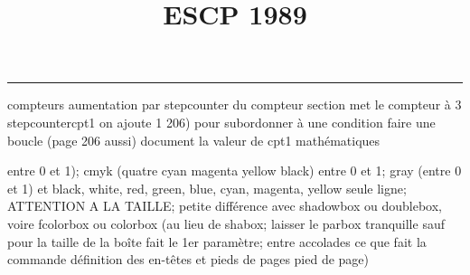 \documentclass[11pt]{article}%
\title{\bf \vspace{-2cm} ESCP 1989} %
\author{} %
\date{} %
\renewcommand{\headrulewidth}{0pt}%
\renewcommand{\footrulewidth}{0.4pt}%
\begin{document}
\maketitle %
\vspace{-1.4cm}\hrule %
\thispagestyle{fancy}

\vspace*{.2cm}



compteurs%
aumentation par stepcounter du compteur section%
met le compteur à 3%
stepcounter{cpt1} on ajoute 1%
206) pour subordonner à une condition %
faire une boucle (page 206 aussi) %
document la valeur de cpt1 
mathématiques\newcommand{\ch}{\operatorname{ch}} 
\newcommand{\sh}{\operatorname{sh}}
\renewcommand{\tanh}{\operatorname{th}}
\renewcommand{\sinh}{\operatorname{sh}}
\renewcommand{\cosh}{\operatorname{ch}}
\newcommand{\argsh}{\operatorname{argsh}}
\newcommand{\argch}{\operatorname{argch}}
\newcommand{\argth}{\operatorname{argth}}
\newcommand{\ker}{\operatorname{Ker}}
\renewcommand{\im}{\operatorname{Im}}
\newcommand{\rg}{\operatorname{rg}}
\newcommand{\Id}{\operatorname{Id}}
\newcommand{\id}{\operatorname{id}}
\renewcommand{\leq}{\leq}
\renewcommand{\geq}{\geq }

entre 0 et 1); cmyk (quatre cyan magenta yellow black) entre 0 et 1;
gray (entre 0 et 1) et black, white, red, green, blue, cyan, magenta,
yellow%
seule ligne; ATTENTION A LA TAILLE; petite différence avec shadowbox ou
doublebox, voire fcolorbox ou colorbox (au lieu de shabox; laisser le
parbox tranquille sauf pour la taille de la boîte
\newcommand{\Tbox}[1]{\begin{center} \shabox{\parbox{0.6
\linewidth}{#1}} \end{center}} %
fait le 1er paramètre; entre accolades ce que fait la commande
définition des en-têtes et pieds de pages\pagestyle{fancy}
\chead{}
\rfoot[ \ \thepage]{\thepage}
\cfoot{}
\lfoot{}
\thispagestyle{fancy} %
pied de page)\renewcommand{\footrulewidth}{0.4pt}
\renewcommand{\headrulewidth}{0.4pt}
\end{document}
